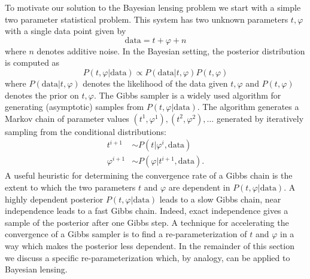 \documentclass[iop,revtex4,apj,onecolumn]{emulateapj}
\begin{document}
To motivate our solution to the Bayesian lensing problem we start with a simple two parameter statistical problem.  This system has two unknown parameters $ t, \varphi$ with a single data point given by
\[\text{data} =  t + \varphi + n\]
where $n$ denotes additive noise.  In the Bayesian setting, the posterior distribution is computed as 
\begin{equation}
\label{post1}
 P( t,\varphi|\text{data})\propto P(\text{data}| t, \varphi) P( t,\varphi) 
 \end{equation}
where $P(\text{data}| t, \varphi)$ denotes the likelihood of the data given  $ t, \varphi$ and $P( t,\varphi)$ denotes the  prior on $ t, \varphi$. 
The Gibbs sampler is a widely used algorithm for generating (asymptotic) samples from  $P( t, \varphi|\text{data})$. The algorithm generates a Markov chain of parameter values $( t^{1}, \varphi^{1}), ( t^{2}, \varphi^{2}),\ldots$ generated by iteratively sampling from the conditional distributions:
\begin{align*}
 t^{i+1} &\sim P( t|\varphi^{i},\text{data}) \\
\varphi^{i+1}   &\sim P(\varphi| t^{i+1},\text{data}).
\end{align*}
A useful heuristic for determining the convergence rate of a Gibbs chain is the extent to which the two parameters $ t$ and $\varphi$ are dependent in $P(t, \varphi|\text{data})$. A highly dependent posterior $P( t, \varphi|\text{data})$ leads to a slow Gibbs chain, near independence leads to a fast Gibbs chain. Indeed, exact independence gives a sample of the posterior after one Gibbs step.  A technique for accelerating the convergence of a Gibbs sampler is to find a  re-parameterization of $ t$ and $\varphi$ in a way which makes the posterior less dependent. In the remainder of this section we discuss a specific re-parameterization which, by analogy, can be applied to Bayesian lensing.
\end{document}

